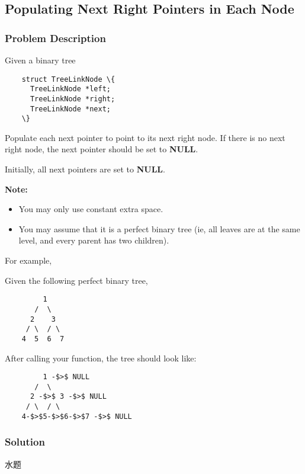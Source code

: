 \documentclass[courier]{article}
\begin{document}
\begin{CJK*}{UTF8}{gkai}
\begin{lstlisting}
\end{lstlisting}


\subsection{ Populating Next Right Pointers in Each Node }

\subsubsection*{Problem Description}
Given a binary tree
\begin{verbatim}
    struct TreeLinkNode \{
      TreeLinkNode *left;
      TreeLinkNode *right;
      TreeLinkNode *next;
    \}
\end{verbatim}

Populate each next pointer to point to its next right node. If there is no next right node, the next pointer should be set to \textbf{NULL}.

Initially, all next pointers are set to \textbf{NULL}.

\textbf{Note:}

\begin{itemize}
\item You may only use constant extra space.
\item You may assume that it is a perfect binary tree (ie, all leaves are at the same level, and every parent has two children).
\end{itemize}

For example,


Given the following perfect binary tree,


\begin{verbatim}
         1
       /  \
      2    3
     / \  / \
    4  5  6  7
\end{verbatim}

After calling your function, the tree should look like:


\begin{verbatim}
         1 -$>$ NULL
       /  \
      2 -$>$ 3 -$>$ NULL
     / \  / \
    4-$>$5-$>$6-$>$7 -$>$ NULL
\end{verbatim}



\subsubsection*{Solution}
水题


\end{CJK*}
\end{document}

